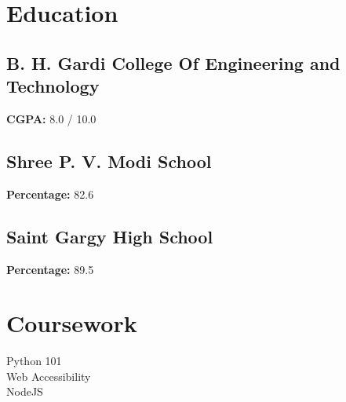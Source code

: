 \documentclass[letterpaper]{deedy-resume} %
\begin{document}
\begin{minipage}[t]{0.33\textwidth}
\sectionspace %


\section{Education} 

\subsection{B. H. Gardi College Of Engineering and Technology}

\textbf{CGPA:} 8.0 / 10.0

\sectionspace %

\subsection{Shree P. V. Modi School}

\textbf{Percentage:} 82.6%

\sectionspace %

\subsection{Saint Gargy High School}

\textbf{Percentage:} 89.5%

\sectionspace %





\section{Coursework}

Python 101 \\
Web Accessibility \\
NodeJS \\
\sectionspace %



\end{minipage} %
\end{document}
